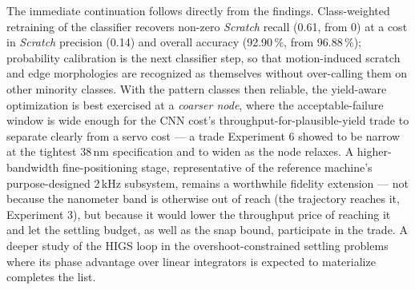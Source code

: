 The immediate continuation follows directly from the findings. Class-weighted retraining of the classifier recovers non-zero \textit{Scratch} recall (0.61, from 0) at a cost in \textit{Scratch} precision (0.14) and overall accuracy (92.90\,\%, from 96.88\,\%); probability calibration is the next classifier step, so that motion-induced scratch and edge morphologies are recognized as themselves without over-calling them on other minority classes. With the pattern classes then reliable, the yield-aware optimization is best exercised at a \textit{coarser node}, where the acceptable-failure window is wide enough for the CNN cost's throughput-for-plausible-yield trade to separate clearly from a servo cost --- a trade Experiment 6 showed to be narrow at the tightest 38\,nm specification and to widen as the node relaxes. A higher-bandwidth fine-positioning stage, representative of the reference machine's purpose-designed 2\,kHz subsystem, remains a worthwhile fidelity extension --- not because the nanometer band is otherwise out of reach (the trajectory reaches it, Experiment 3), but because it would lower the throughput price of reaching it and let the settling budget, as well as the snap bound, participate in the trade. A deeper study of the HIGS loop in the overshoot-constrained settling problems where its phase advantage over linear integrators is expected to materialize completes the list.

\goodbreak
